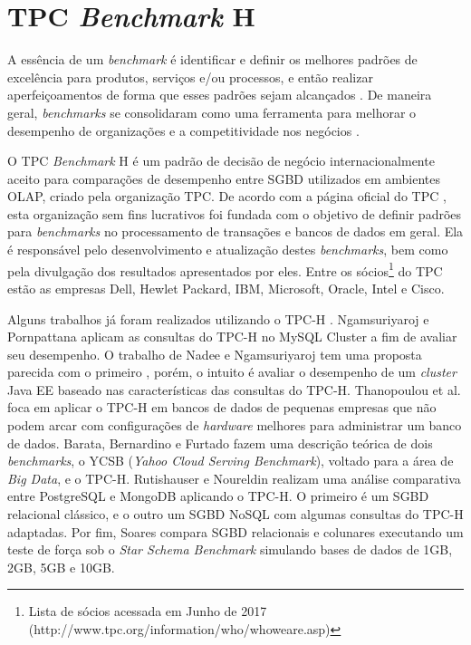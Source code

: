 \chapter{TPC \textit{Benchmark} H}
\label{tpch}

A essência de um \textit{benchmark} é identificar e definir os melhores padrões de excelência para produtos, serviços e/ou processos, e então realizar aperfeiçoamentos de forma que esses padrões sejam alcançados \cite{bhutta1999benchmarking}. De maneira geral, \textit{benchmarks} se consolidaram como uma ferramenta para melhorar o desempenho de organizações e a competitividade nos negócios \cite{kyro2003revising}.

O TPC \textit{\textit{Benchmark}} H é um padrão de decisão de negócio internacionalmente aceito para comparações de desempenho entre SGBD utilizados em ambientes OLAP, criado pela organização TPC. De acordo com a página oficial do TPC \cite{tpc2017page}, esta organização sem fins lucrativos foi fundada com o objetivo de definir padrões para \textit{benchmarks} no processamento de transações e bancos de dados em geral. Ela é responsável pelo desenvolvimento e atualização destes \textit{benchmarks}, bem como pela divulgação dos resultados apresentados por eles. Entre os sócios\footnote{Lista de sócios acessada em Junho de 2017 (http://www.tpc.org/information/who/whoweare.asp)} do TPC estão as empresas Dell, Hewlet Packard, IBM, Microsoft, Oracle, Intel e Cisco.

Alguns trabalhos já foram realizados utilizando o TPC-H \cite{ngamsuriyaroj2010performance, nadee2012performance, thanopoulou2012benchmarking, barata2014ycsb, rutishauser2012tpc, soares2012avaliaccao}. Ngamsuriyaroj e Pornpattana \cite{ngamsuriyaroj2010performance} aplicam as consultas do TPC-H no MySQL Cluster a fim de avaliar seu desempenho. O trabalho de Nadee e Ngamsuriyaroj \cite{nadee2012performance} tem uma proposta parecida com o primeiro \cite{ngamsuriyaroj2010performance}, porém, o intuito é avaliar o desempenho de um \textit{cluster} Java EE baseado nas características das consultas do TPC-H. Thanopoulou et al. \cite{thanopoulou2012benchmarking} foca em aplicar o TPC-H em bancos de dados de pequenas empresas que não podem arcar com configurações de \textit{hardware} melhores para administrar um banco de dados. Barata, Bernardino e Furtado \cite{barata2014ycsb} fazem uma descrição teórica de dois \textit{benchmarks}, o YCSB (\textit{Yahoo Cloud Serving Benchmark}), voltado para a área de \textit{Big Data}, e o TPC-H. Rutishauser e Noureldin \cite{rutishauser2012tpc} realizam uma análise comparativa entre PostgreSQL e MongoDB aplicando o TPC-H. O primeiro é um SGBD relacional clássico, e o outro um SGBD NoSQL com algumas consultas do TPC-H adaptadas. Por fim, Soares \cite{soares2012avaliaccao} compara SGBD relacionais e colunares executando um teste de força sob o \textit{Star Schema Benchmark} simulando bases de dados de 1GB, 2GB, 5GB e 10GB.

